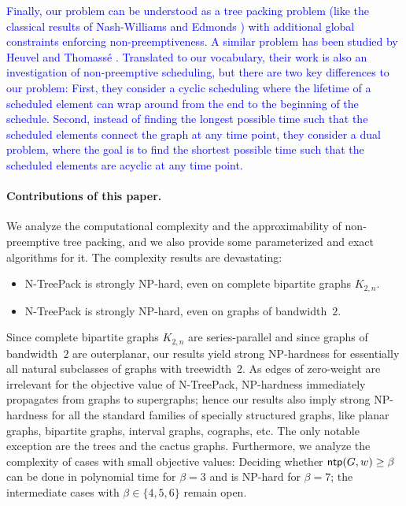 \documentclass[runningheads]{llncs}
\newcommand{\xxxNTP}{{\sc N-TreePack}}
\DeclareMathOperator{\ntp}{\text{\sf ntp}}
\newcommand{\lasse}[1]{\textcolor{blue}{#1}}
\begin{document}
 \lasse{
Finally, our problem can be understood as a tree packing problem (like the classical results of Nash-Williams \cite{Nash-Williams1961} and Edmonds \cite{edmonds1965minimum}) with additional global constraints enforcing non-preemptiveness. 
A similar problem has been studied by Heuvel and Thomassé \cite{van2012cyclic}.
 Translated to our vocabulary, their work is also an investigation of non-preemptive scheduling, but there are two key differences to our problem: First, they consider a cyclic scheduling where the lifetime of a scheduled element can wrap around from the end to the beginning of the schedule.
  Second, instead of finding the longest possible time such that the scheduled elements connect the graph at any time point, they consider a dual problem, where the goal is to find the shortest possible time such that the scheduled elements are acyclic at any time point. 
}

\paragraph{Contributions of this paper.}
We analyze the computational complexity and the approximability of non-preemptive 
tree packing, and we also provide some parameterized and exact algorithms for it.
The complexity results are devastating:
\begin{itemize}
\item {\xxxNTP} is strongly NP-hard, even on complete bipartite graphs $K_{2,n}$. 
\item {\xxxNTP} is strongly NP-hard, even on graphs of bandwidth~$2$.
\end{itemize}
Since complete bipartite graphs $K_{2,n}$ are series-parallel and since graphs of 
bandwidth~$2$ are outerplanar, our results yield strong NP-hardness for essentially 
all natural subclasses of graphs with treewidth~$2$.
As edges of zero-weight are irrelevant for the objective value of {\xxxNTP}, NP-hardness 
immediately propagates from graphs to supergraphs; hence our results also imply 
strong NP-hardness for all the standard families of specially structured graphs, 
like planar graphs, bipartite graphs, interval graphs, cographs, etc.
The only notable exception are the trees and the cactus graphs.
Furthermore, we analyze the complexity of cases with small objective values:
Deciding whether $\ntp(G,w)\ge\beta$ can be done in polynomial time for $\beta=3$
and is NP-hard for $\beta=7$; the intermediate cases with $\beta\in\{4,5,6\}$ remain open.
\end{document}
